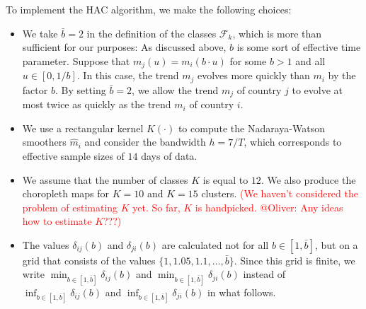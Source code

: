 \documentclass[a4paper,12pt]{article}
\numberwithin{equation}{section}
\begin{document}
To implement the HAC algorithm, we make the following choices:
\begin{itemize}[leftmargin=0.6cm]
\item We take $\bar{b} = 2$ in the definition of the classes $\mathcal{F}_k$, which is more than sufficient for our purposes: As discussed above, $b$ is some sort of effective time parameter. Suppose that $m_j(u) = m_i(b \cdot u)$ for some $b > 1$ and all $u \in [0,1/b]$. In this case, the trend $m_j$ evolves more quickly than $m_i$ by the factor $b$. By setting $\bar{b} = 2$, we allow the trend $m_j$ of country $j$ to evolve at most twice as quickly as the trend $m_i$ of country $i$.  
\item We use a rectangular kernel $K(\cdot)$ to compute the Nadaraya-Watson smoothers $\hat{m}_{i}$ and consider the bandwidth $h = 7/T$, which corresponds to effective sample sizes of $14$ days of data. 
\item We assume that the number of classes $K$ is equal to $12$. We also produce the choropleth maps for $K=10$ and $K = 15$ clusters. \textcolor{red}{(We haven't considered the problem of estimating $K$ yet. So far, $K$ is handpicked. @Oliver: Any ideas how to estimate $K$???)}
\item The values $\delta_{ij}(b)$ and $\delta_{ji}(b)$ are calculated not for all $b\in [1, \bar{b}]$, but on a grid that consists of the values $\{1, 1.05, 1.1, \ldots, \bar{b}\}$. Since this grid is finite, we write $\min_{b \in [1, \bar{b}]} \delta_{ij}(b)$ and $\min_{b \in [1, \bar{b}]} \delta_{ji}(b)$ instead of $\inf_{b \in [1, \bar{b}]} \delta_{ij}(b)$ and $\inf_{b \in [1, \bar{b}]} \delta_{ji}(b)$ in what follows.
\end{itemize}
\end{document}
